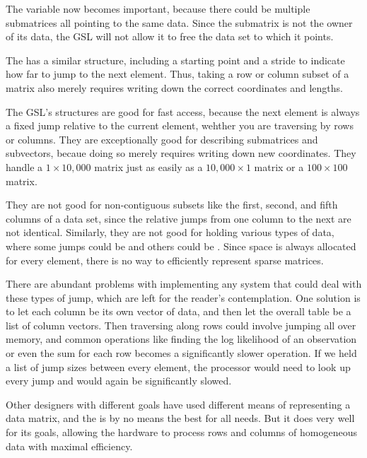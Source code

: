 The 
variable now becomes important, because there could be multiple
submatrices all pointing to the same data. Since the submatrix is not
the owner of its data, the GSL will not allow it to free the data set
to which it points.

The  has a similar structure, including a starting point
and a stride to indicate how far to jump to the next element. Thus,
taking a row or column subset of a matrix also merely requires writing
down the correct coordinates and lengths.

The GSL's structures are good for fast access, because the next element
is always a fixed jump relative to the current element, wehther you are
traversing by rows or columns. They are exceptionally good for
describing submatrices and subvectors, becaue doing so merely requires
writing down new coordinates. They handle a $1 \times 10,000$ matrix
just as easily as a $10,000 \times 1$ matrix or a $100 \times 100$ matrix.

They are not good for non-contiguous subsets like the first, second,
and fifth columns of a data set, since the relative jumps from one column
to the next are not identical. Similarly, they are not good for holding
various types of data, where some jumps could be 
and others could be . Since space is always allocated
for every element, there is no way to efficiently represent sparse matrices.

There are abundant problems with implementing any system that could
deal with these types of jump, which are left for the reader's
contemplation. One solution is to let each column be its own vector of
data, and then let the overall table be a list of column vectors. Then
traversing along rows could involve jumping all over memory, and common
operations like finding the log likelihood of an observation or even
the sum for each row becomes a significantly slower operation. If we
held a list of jump sizes between every element, the processor would
need to look up every jump and would again be significantly slowed.

Other designers with different goals have used different means of
representing a data matrix, and the  is by no means the
best for all needs. But it does very well for its goals, allowing the
hardware to process rows and columns of homogeneous data with maximal
efficiency.

